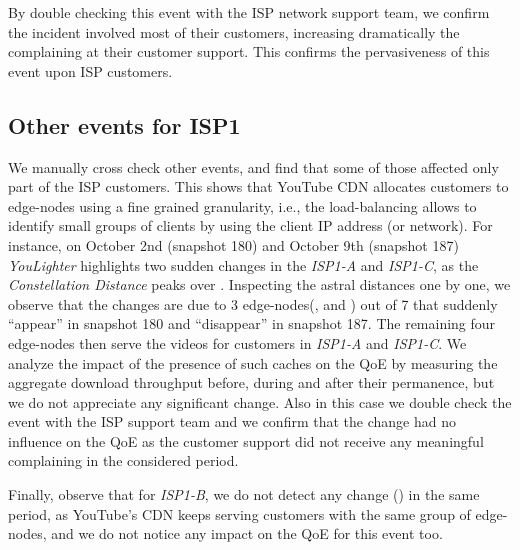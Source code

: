 \documentclass{acm_proc_article-sp}
\newcommand{\tool}{\textit{YouLighter}\xspace}
\newcommand{\distance}{\textit{Constellation Distance}\xspace}
\newcommand{\nodes}{{edge-nodes}\xspace}
\newcommand{\TApub}{\textit{ISP1-A}\xspace}
\newcommand{\TApri}{\textit{ISP1-B}\xspace}
\newcommand{\TBpub}{\textit{ISP1-C}\xspace}
\begin{document}
\begin{table}[t!]
\centering
{}
  \caption{Fractions of video and audio DASH formats served by Good-\FRA and Bad-\FRA. Dataset \TApri.}
  \label{tab:formats}
\end{table}

By double checking this event with the ISP network support team, we confirm the incident involved most of their customers, increasing dramatically the complaining at their customer support.
This confirms the pervasiveness of this event upon ISP customers.



\subsection{Other events for ISP1}
We manually cross check other events, and find that some of those affected only part of the ISP customers.
This shows that YouTube CDN allocates customers to \nodes using a fine grained granularity, i.e., the load-balancing allows to identify small groups of clients by using the client IP address (or network).
For instance, on October 2nd (snapshot 180) and October 9th (snapshot 187) \tool highlights two sudden changes in the \TApub and \TBpub, as the \distance peaks over .
Inspecting the astral distances one by one, we observe that the changes are due to 3 \nodes(\SWI, \SWII and \LND) out of 7 that suddenly ``appear'' in snapshot 180 and ``disappear'' in snapshot 187. The remaining four \nodes then serve the videos for customers in \TApub and \TBpub. We analyze the impact of the presence of such caches on the QoE by measuring the aggregate download throughput before, during and after their permanence, but we do not appreciate any significant change. Also in this case we double check the event with the ISP support team and we confirm that the change had no influence on the QoE as the customer support did not receive any meaningful complaining in the considered period.

Finally, observe that for \TApri, we do not detect any change () in the same period, as YouTube's CDN keeps serving customers with the same group of \nodes, and we do not notice any impact on the QoE for this event too.
\end{document}
